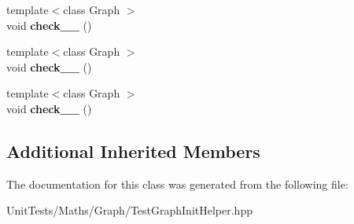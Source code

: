 \begin{DoxyCompactItemize}
\item 
\mbox{\label{classsequoia_1_1unit__testing_1_1undirected__embedded__init__checker_a3da63c5e28b636328c2815cac7d9e9f2}} 
{\footnotesize template$<$class Graph $>$ }\\void {\bfseries check\+\_\+\_} ()
\item 
\mbox{\label{classsequoia_1_1unit__testing_1_1undirected__embedded__init__checker_ac8d7b6f714921b566b454cb9444acfde}} 
{\footnotesize template$<$class Graph $>$ }\\void {\bfseries check\+\_\+\_} ()
\item 
\mbox{\label{classsequoia_1_1unit__testing_1_1undirected__embedded__init__checker_a35220ae48812d1a24e773b3fbdf78ca1}} 
{\footnotesize template$<$class Graph $>$ }\\void {\bfseries check\+\_\+\_} ()
\end{DoxyCompactItemize}
\subsection*{Additional Inherited Members}


The documentation for this class was generated from the following file\+:\begin{DoxyCompactItemize}
\item 
Unit\+Tests/\+Maths/\+Graph/Test\+Graph\+Init\+Helper.\+hpp\end{DoxyCompactItemize}
